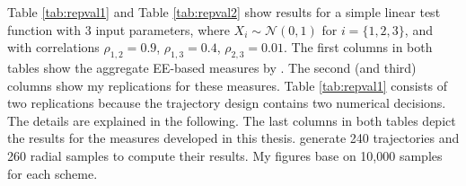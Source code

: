 \documentclass[a4paper,12pt]{article}
\begin{document}
\noindent
Table \ref{tab:repval1} and Table \ref{tab:repval2} show results for a simple linear test function with 3 input parameters, where $X_i \sim \mathcal{N}(0, 1)$ for $i=\{1,2,3\}$, and with correlations $\rho_{1,2}=0.9$, $\rho_{1,3}=0.4$, $\rho_{2,3}=0.01$. The first columns in both tables show the aggregate EE-based measures by \cite{ge2017extending}. The second (and third) columns show my replications for these measures. Table \ref{tab:repval1} consists of two replications because the trajectory design contains two numerical decisions. The details are explained in the following. The last columns in both tables depict the results for the measures developed in this thesis. \citeauthor{ge2017extending} generate 240 trajectories and 260 radial samples to compute their results. My figures base on 10,000 samples for each scheme.
\newpage
\setlength{\tabcolsep}{12pt} %
\end{document}
